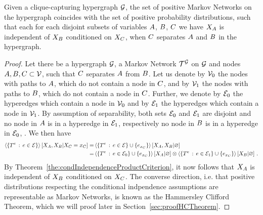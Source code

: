 \begin{theorem}\label{the:condIndMN}
	Given a clique-capturing hypergraph $\mathcal{G}$, the set of positive Markov Networks on the hypergraph coincides with the set of positive probability distributions, such that each for each disjoint subsets of variables $A$, $B$, $C$ we have $X_{A}$ is independent of $X_{B}$ conditioned on $X_{C}$, when $C$ separates $A$ and $B$ in the hypergraph. %
\end{theorem}
\begin{proof}
	Let there be a hypergraph $\mathcal{G}$, a Markov Network $\mathcal{T}^{\mathcal{G}}$ on $\mathcal{G}$ and nodes $A,B,C \subset \mathcal{V}$, such that $C$ separates $A$ from $B$.
	Let us denote by $\mathcal{V}_0$ the nodes with paths to $A$, which do not contain a node in $C$, and by $\mathcal{V}_1$ the nodes with paths to $B$, which do not contain a node in $C$.
	Further, we denote by $\mathcal{E}_0$ the hyperedges which contain a node in $\mathcal{V}_0$ and by $\mathcal{E}_1$ the hyperedges which contain a node in $\mathcal{V}_1$.
	By assumption of separability, both sets $\mathcal{E}_0$ and $\mathcal{E}_1$ are disjoint and no node in $A$ is in a hyperedge in $\mathcal{E}_1$, respectively no node in $B$ is in a hyperedge in $\mathcal{E}_0$, .
	We then have
	\begin{align*}
		\left\langle \{T^{e}\, : \, e\in\mathcal{E}\}\right\rangle \left[ X_{A},X_{B} | X_{C}=x_{C} \right] 
		= & \left\langle \{T^{e}\, : \, e\in\mathcal{E}\}\cup\{e_{x_{C}}\}\right\rangle \left[ X_{A},X_{B} | \varnothing \right] \\
		= &  \left\langle \{T^{e}\, : \, e\in\mathcal{E}_0\}\cup\{e_{x_{C}}\}\right\rangle \left[ X_{A} | \varnothing \right]
		\otimes \left\langle \{T^{e}\, : \, e\in\mathcal{E}_1\}\cup\{e_{x_{C}}\}\right\rangle \left[ X_{B} | \varnothing \right] \, .
	\end{align*}
	By Theorem~\ref{the:condIndependenceProductCriterion}, it now follows that $X_{A}$ is independent of $X_{B}$ conditioned on $X_{C}$.
	The converse direction, i.e. that positive distributions respecting the conditional indpendence assumptions are representable as Markov Networks, is known as the Hammersley Clifford Theorem, 
	which we will proof later in Section~\ref{sec:proofHCTheorem}.
\end{proof}

